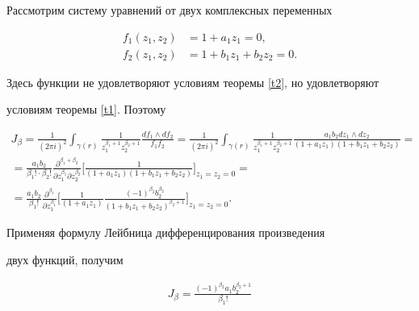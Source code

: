 \begin{exam}


Рассмотрим систему уравнений от двух комплексных переменных


\begin{equation}\label{f13}


\begin{split} f_1(z_1,z_2)&=1+a_1z_1=0,\\


f_2(z_1,z_2)&=1+b_1z_1+b_2z_2=0. \end{split}


\end{equation}


Здесь функции не удовлетворяют условиям теоремы \ref{t2}, но удовлетворяют 


условиям теоремы \ref{t1}. Поэтому


\begin{gather*}


J_\beta=\frac 1{(2\pi i)^2}\int_{\gamma(r)}\frac


1{z_1^{\beta_1+1}z_2^{\beta_2+1}}


\frac{df_1\land df_2}{f_1f_2}=


\frac 1{(2\pi i)^2}\int_{\gamma(r)}\frac 1{z_1^{\beta_1+1}z_2^{\beta_2+1}}


\frac{a_1b_2 dz_1\land dz_2}{(1+a_1z_1)(1+b_1z_1+b_2z_2)}= \\


%


=\frac{a_1b_2}{\beta_1!\cdot\beta_2!}\frac{\partial^{\beta_1+\beta_2}}{


\partial z_1^{\beta_1}\partial z_2^{\beta_2}}\bigg[\frac 1


{(1+a_1z_1)(1+b_1z_1+b_2z_2)}\bigg]_{z_1=z_2=0}= \\


%


=\frac{a_1b_2}{\beta_1!} \frac{\partial^{\beta_1}}{


\partial z_1^{\beta_1}}\bigg[\frac 1{(1+a_1z_1)}\frac{(-1)^{\beta_2}


b_2^{\beta_2}}{(1+b_1z_1+b_2z_2)^{\beta_2+1}}\bigg]_{z_1=z_2=0}.


\end{gather*}


Применяя формулу Лейбница дифференцирования произведения 


двух функций, получим


\begin{gather*}


J_\beta=\frac{(-1)^{\beta_2}a_1b_2^{\beta_2+1}}{\beta_1!}



\end{gather*}
\end{exam}
